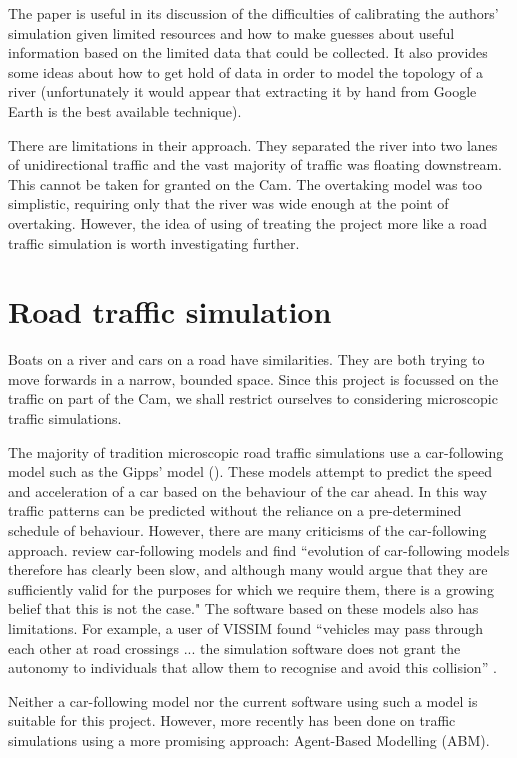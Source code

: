   The paper is useful in its discussion of the difficulties of calibrating
  the authors' simulation given limited resources and how to make guesses
  about useful information based on the limited data that could be
  collected. It also provides some ideas about how to get hold of data
  in order to model the topology of a river (unfortunately it would
  appear that extracting it by hand from Google Earth is the best available
  technique). 
  
  There are limitations in their approach. They 
  separated the river into two lanes of unidirectional traffic and the
  vast majority of traffic was floating downstream. This cannot be taken for granted on the Cam. The overtaking model was too simplistic, requiring only that the river was wide enough at the point of overtaking.
  However, the idea of using of treating the project more like a road traffic simulation is worth investigating further.
  
  \section{Road traffic simulation}
    Boats on a river and cars on a road have similarities. They are both trying to move forwards in a narrow, bounded space. Since this project is focussed on the traffic on part of the Cam, we shall restrict ourselves to considering microscopic traffic simulations.
    
    The majority of tradition microscopic road traffic simulations use a car-following model such as the Gipps' model (\cite{Gipps1981}). These models attempt to predict the speed and acceleration of a car based on the behaviour of the car ahead. In this way traffic patterns can be predicted without the reliance on a pre-determined schedule of behaviour. However, there are many criticisms of the car-following approach. \textcite{Brackstone2000} review car-following models and find ``evolution of car-following models therefore has clearly been slow, and although many would argue that they are sufficiently valid for the purposes for which we require them, there is a growing belief that this is not the case." The software based on these models also has limitations. For example, a user of VISSIM found ``vehicles may pass through each other at road crossings ... the simulation software does not grant the autonomy to individuals that allow them to recognise and avoid this collision'' \cite{Manley}.
    
    Neither a car-following model nor the current software using such a model is suitable for this project. However, more recently has been done on traffic simulations using a more promising approach: Agent-Based Modelling (ABM).
      
